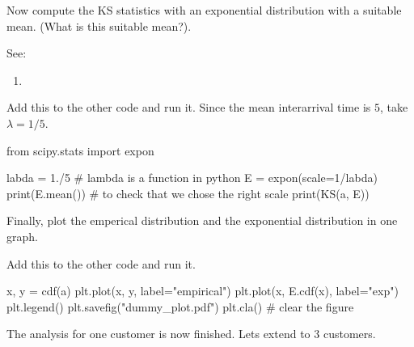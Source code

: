 \documentclass{scrartcl}
\begin{document}
\begin{exercise}
  Now compute the KS statistics with an exponential distribution with a suitable mean. (What is this suitable mean?).

See:
\begin{enumerate}
\item  {}
\end{enumerate}


\begin{solution}
Add this to the other code and run it. Since the mean interarrival time is $5$, take $\lambda = 1/5$.

\begin{pyverbatim}
from scipy.stats import expon

labda = 1./5 # lambda is a function in python
E = expon(scale=1/labda) 
print(E.mean()) # to check that we chose the right scale
print(KS(a, E))    
\end{pyverbatim}
\end{solution}
\end{exercise}

\begin{exercise}
  Finally, plot the emperical distribution and the exponential distribution in one graph.
\begin{solution}
Add this to the other code and run it. 
\begin{pyverbatim}
x, y = cdf(a)
plt.plot(x, y,  label="empirical")
plt.plot(x, E.cdf(x),  label="exp")
plt.legend()
plt.savefig("dummy_plot.pdf")
plt.cla() # clear the figure
\end{pyverbatim}
\end{solution}
\end{exercise}

The analysis for one customer is now finished. Lets extend to 3 customers. 
\end{document}
